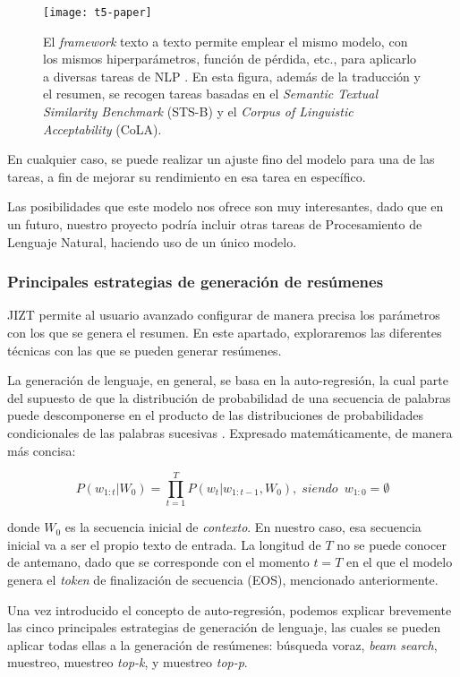 \begin{figure}[h]
	\centering
	\texttt{[image: t5-paper]}
	\caption[Ejemplo del modelo T5 de Google.]{El \emph{framework} texto a texto permite emplear el mismo modelo, con los mismos hiperparámetros, función de pérdida, etc., para aplicarlo a diversas tareas de NLP \cite{raffel19}. En esta figura, además de la traducción y el resumen, se recogen tareas basadas en el \emph{Semantic Textual Similarity Benchmark} (STS-B) y el \emph{Corpus of Linguistic Acceptability} (CoLA).}
\end{figure}


En cualquier caso, se puede realizar un ajuste fino del modelo para una de las tareas, a fin de mejorar su rendimiento en esa tarea en específico.

Las posibilidades que este modelo nos ofrece son muy interesantes, dado que en un futuro, nuestro proyecto podría incluir otras tareas de Procesamiento de Lenguaje Natural, haciendo uso de un único modelo.


\bigskip
\subsubsection{Principales estrategias de generación de resúmenes} \label{subsec:estrategias-gen}

JIZT permite al usuario avanzado configurar de manera precisa los parámetros con los que se genera el resumen. En este apartado, exploraremos las diferentes técnicas con las que se pueden generar resúmenes.

La generación de lenguaje, en general, se basa en la auto-regresión, la cual parte del supuesto de que la distribución de probabilidad de una secuencia de palabras puede descomponerse en el producto de las distribuciones de probabilidades  condicionales de las palabras sucesivas \cite{platen20}. Expresado matemáticamente, de manera más concisa:

\[ P(w_{1:t} | W_0) = \prod_{t=1}^{T} P(w_t | w_{1:t-1}, W_0), \; siendo \enspace w_{1:0} = \emptyset \]

donde $W_0$ es la secuencia inicial de \emph{contexto}. En nuestro caso, esa secuencia inicial va a ser el propio texto de entrada. La longitud de $T$ no se puede conocer de antemano, dado que se corresponde con el momento $t = T$ en el que el modelo genera el \emph{token} de finalización de secuencia (EOS), mencionado anteriormente.

Una vez introducido el concepto de auto-regresión, podemos explicar brevemente las cinco	 principales estrategias de generación de lenguaje, las cuales se pueden aplicar todas ellas a la generación de resúmenes: búsqueda voraz, \emph{beam search}, muestreo, muestreo \emph{top-k}, y muestreo \emph{top-p}.

